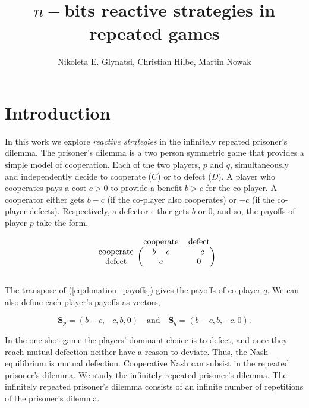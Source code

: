 \documentclass{article}
\title{$n-$bits reactive strategies in repeated games}
\author{Nikoleta E. Glynatsi, Christian Hilbe, Martin Nowak}
\date{}
\theoremstyle{definition}
\begin{document}
\maketitle

\section{Introduction}

In this work we explore \textit{reactive strategies} in the infinitely repeated
prisoner's dilemma. The prisoner's dilemma is a two person symmetric game that
provides a simple model of cooperation. Each of the two players, \(p\) and
\(q\), simultaneously and independently decide to cooperate (\(C\)) or to defect
(\(D\)). A player who cooperates pays a cost \(c > 0\) to provide a benefit
\(b > c\) for the co-player. A cooperator either gets \(b - c\) (if the
co-player also cooperates) or \(-c\) (if the co-player defects). Respectively, a defector either gets
\(b\) or 0, and so, the payoffs of player \(p\) take the form,

\begin{equation}\label{eq:donation_payoffs}
  \begin{blockarray}{ccc}
      & \text{cooperate} & \text{defect} \\
      \begin{block}{c(cc)}
          \text{cooperate} & b - c & -c \\
          \text{defect} & c & 0 \\
      \end{block}
  \end{blockarray}
\end{equation}

The transpose of (\ref{eq:donation_payoffs}) gives the payoffs of
co-player \(q\). We can also define each player's payoffs as vectors,

\begin{equation}\label{eq:vector_payoffs}
  \mathbf{S}_{p} = (b-c, -c, b, 0) \quad \textrm{and} \quad  \mathbf{S}_{q} = (b - c, b, -c, 0).
\end{equation}

In the one shot game the players' dominant choice is to defect, and once they
reach mutual defection neither have a reason to deviate. Thus, the Nash
equilibrium is mutual defection. Cooperative Nash can subsist in the repeated
prisoner's dilemma. We study the infinitely repeated prisoner's dilemma. The
infinitely repeated prisoner's dilemma consists of an infinite number of
repetitions of the prisoner's dilemma.
\end{document}
